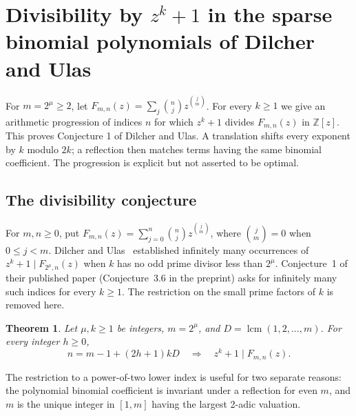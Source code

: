 \documentclass[11pt,a4paper]{article}
\numberwithin{equation}{section}
\newtheorem{theorem}{Theorem}[section]
\theoremstyle{definition}
\theoremstyle{remark}
\newenvironment{sectionabstract}{\par\smallskip\begingroup\small\noindent}{\par\endgroup\medskip}
\begin{document}
\par\endgroup

\begingroup

\section{\texorpdfstring{Divisibility by \(z^k+1\) in the sparse binomial polynomials of Dilcher and Ulas}{Divisibility by z^k+1 in the sparse binomial polynomials of Dilcher and Ulas}}\label{section:r35heisei}
\par\medskip


\begin{sectionabstract}
For \(m=2^\mu\ge2\), let \(F_{m,n}(z)=\sum_j\binom nj z^{\binom jm}\).
For every \(k\ge1\) we give an arithmetic progression of indices \(n\)
for which \(z^k+1\) divides \(F_{m,n}(z)\) in \(\mathbb Z[z]\).
This proves Conjecture 1 of Dilcher and Ulas. A translation shifts every
exponent by \(k\) modulo \(2k\); a reflection then matches terms having
the same binomial coefficient. The progression is explicit but not asserted
to be optimal.
\end{sectionabstract}

\subsection{The divisibility conjecture}
For \(m,n\ge0\), put \(F_{m,n}(z)=\sum_{j=0}^n\binom nj z^{\binom jm}\),
where \(\binom jm=0\) when \(0\le j<m\).
Dilcher and Ulas~\cite{r35heisei:DU} established infinitely many occurrences of
\(z^k+1\mid F_{2^\mu,n}(z)\) when \(k\) has no odd prime divisor less
than \(2^\mu\). Conjecture~1 of their published paper
(Conjecture~3.6 in the preprint) asks for infinitely many such indices
for every \(k\ge1\). The restriction on the small prime factors of \(k\)
is removed here.
\begin{theorem}\label{r35heisei:main}
Let \(\mu,k\ge1\) be integers, \(m=2^\mu\), and
\(D=\operatorname{lcm}(1,2,\ldots,m)\). For every integer \(h\ge0\),
\[
 n=m-1+(2h+1)kD \quad\Longrightarrow\quad z^k+1\mid F_{m,n}(z).
\]
\end{theorem}
The restriction to a power-of-two lower index is useful for two separate
reasons: the polynomial binomial coefficient is invariant under a
reflection for even \(m\), and \(m\) is the unique integer in
\([1,m]\) having the largest 2-adic valuation.
\end{document}
